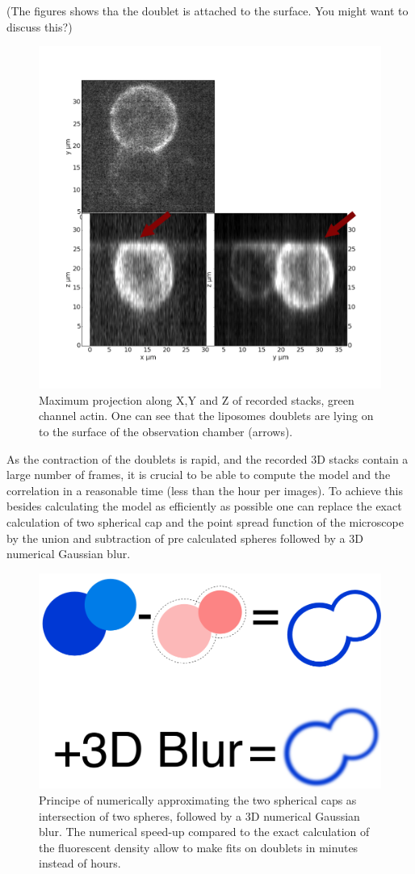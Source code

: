 \documentclass[A4paperpaper,11pt,english]{sphinxmanual}
\begin{document}
(The figures shows tha the doublet is attached to the surface. You might want to discuss this?)
\begin{figure}[htbp]
\centering
\capstart

\includegraphics[width=0.800\linewidth]{max_proj_340A.png}
\caption{Maximum projection along X,Y and Z of recorded stacks, green channel actin.
One can see that the liposomes doublets are lying on  to the surface of the
observation chamber (arrows).}\label{parts/part4:mproj1}\end{figure}

As the contraction of the doublets is rapid, and the recorded 3D stacks contain a
large number of frames, it is crucial to be able to compute the model and the
correlation in a reasonable time (less than the hour per images). To
achieve this besides calculating the model as efficiently as possible one can
replace the exact calculation of two spherical cap and the point spread
function of the microscope by the union and subtraction of pre calculated spheres followed by a 3D
numerical Gaussian blur.
\begin{figure}[htbp]
\centering
\capstart

\includegraphics[width=0.600\linewidth]{3dblur.png}
\caption{Principe of numerically approximating the two spherical caps as intersection of two spheres,
followed by a 3D numerical Gaussian blur. The
numerical speed-up compared to the exact calculation of the fluorescent density allow
to make fits on doublets in minutes instead of hours.}\end{figure}
\end{document}
